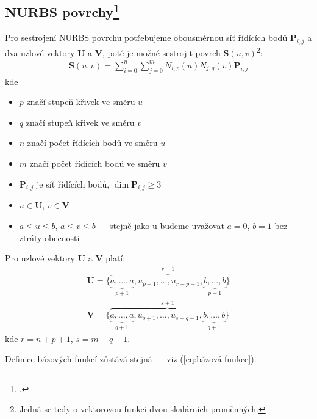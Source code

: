 \subsection[NURBS povrchy]{NURBS povrchy\footcite[kapitola 3.4]{The_NURBS_Book}}
Pro sestrojení NURBS povrchu potřebujeme obousměrnou síť řídících bodů $\bm{P}_{i,j}$ a
dva uzlové vektory $\bm{U}$ a $\bm{V}$, poté je možné sestrojit povrch $\bm{S}(u,v)$\footnote{Jedná se tedy o vektorovou funkci dvou skalárních proměnných.}:
\begin{align}
    \bm{S}(u,v) = \sum_{i=0}^{n}\sum_{j=0}^{m}N_{i,p}(u)N_{j,q}(v)\bm{P}_{i,j}
\end{align}
kde
\begin{itemize}
    \item $p$ značí stupeň křivek ve směru $u$
    \item $q$ značí stupeň křivek ve směru $v$
    \item $n$ značí počet řídících bodů ve směru $u$
    \item $m$ značí počet řídících bodů ve směru $v$
    \item $\bm{P}_{i,j}$ je síť řídících bodů, $\dim{\bm{P}_{i,j}} \ge 3$
    \item $u \in \bm{U}$, $v \in \bm{V}$
    \item $a \le u \le b$, $a \le v \le b$ --- stejně jako u  budeme uvažovat $a = 0$, $b = 1$ bez ztráty obecnosti
\end{itemize}
Pro uzlové vektory $\bm{U}$ a $\bm{V}$ platí:
\begin{align}
    \bm{U} = \{\overbrace{\underbrace{a, \ldots, a}_{p + 1}, u_{p + 1}, \ldots, u_{r -p - 1}, \underbrace{b, \ldots, b}_{p + 1}}^{r + 1}\}\\
    \bm{V} = \{\overbrace{\underbrace{a, \ldots, a}_{q + 1}, u_{q + 1}, \ldots, u_{s -q - 1}, \underbrace{b, \ldots, b}_{q + 1}}^{s + 1}\}
\end{align}
kde $r = n + p + 1$, $s = m + q + 1$. \par Definice bázových funkcí zůstává stejná --- viz (\ref{eq:bázová funkce}).